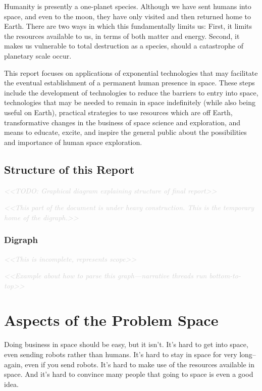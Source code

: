 \documentclass[letter,11pt]{article}
\newcommand{\todo}[1]{\textcolor{lightgray}{\textit{<<#1>>}}}
\begin{document}
Humanity is presently a one-planet species. Although we have sent
humans into space, and even to the moon, they have only visited and
then returned home to Earth. There are two ways in which this
fundamentally limits us: First, it limits the resources available to
us, in terms of both matter and energy. Second, it makes us vulnerable
to total destruction as a species, should a catastrophe of planetary
scale occur.

This report focuses on applications of exponential technologies that may
facilitate the eventual establishment of a permanent human presence in space.
These steps include the development of technologies to reduce the barriers to
entry into space, technologies that may be needed to remain in space
indefinitely (while also being useful on Earth), practical strategies to use
resources which are off Earth, transformative changes in the business of space
science and exploration, and means to educate, excite, and inspire the general
public about the possibilities and importance of human space exploration.

\subsection{Structure of this Report}

\todo{TODO: Graphical diagram explaining structure of final report}

\todo{This part of the document is under heavy construction. This is the temporary home of the digraph.}

\subsubsection{Digraph}

\todo{This is incomplete, represents scope}

\todo{Example about how to parse this graph---narrative threads run bottom-to-top}





\section{Aspects of the Problem Space}
Doing business in space should be easy, but it isn't. It's hard to get into
space, even sending robots rather than humans. It's hard to stay in space for
very long--again, even if you send robots.  It's hard to make use of the
resources available in space. And it's hard to convince many people that going
to space is even a good idea.
\end{document}
